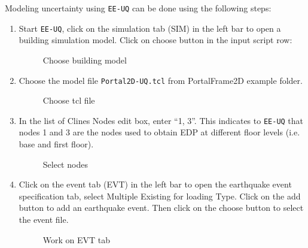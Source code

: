 Modeling uncertainty using \texttt{EE-UQ} can be done using the
following steps:
\begin{enumerate}
\item	 Start \texttt{EE-UQ}, click on the simulation tab (SIM) in the left bar to open a building simulation model. Click on choose button in the input script row:

\begin{figure}[!htbp]
  \caption{Choose building model}
  \label{fig:figure21}
\end{figure}

\item	 Choose the model file \texttt{Portal2D-UQ.tcl} from PortalFrame2D example folder.
\begin{figure}[!htbp]
  \caption{Choose tcl file}
  \label{fig:figure22}
\end{figure}


\item	 In the list of Clines Nodes edit box, enter “1, 3”. This indicates to \texttt{EE-UQ} that nodes 1 and 3 are the nodes used to obtain EDP at different floor levels (i.e. base and first floor).
\begin{figure}[!htbp]
   \caption{Select
    nodes} \label{fig:figure23}
\end{figure}

\item Click on the event tab (EVT) in the left bar to open the earthquake event specification tab, select Multiple Existing for loading Type. Click on the add button to add an earthquake event. 
Then click on the choose button to select the event file.
\begin{figure}[!htbp]
    \caption{Work on EVT
    tab} \label{fig:figure24}
\end{figure}


\end{enumerate}
